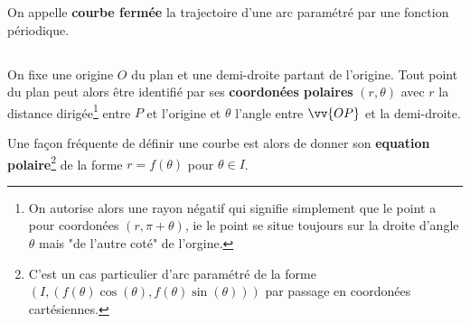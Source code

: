 On appelle \textbf{courbe fermée} la trajectoire d'une arc paramétré par une fonction périodique.

\subsection*{}
On fixe une origine \(O\) du plan et une demi-droite partant de l'origine.
Tout point du plan peut alors être identifié par ses \textbf{coordonées polaires} \((r, \theta)\) avec \(r\) la distance dirigée\footnote[3]{ On autorise alors une rayon négatif qui signifie simplement que le point a pour coordonées \((r, \pi + \theta)\), ie le point se situe toujours sur la droite d'angle \(\theta\) mais "de l'autre coté" de l'orgine.} entre \(P\) et l'origine et \(\theta\) l'angle entre \(\vv{OP}\) et la demi-droite.\<

Une façon fréquente de définir une courbe est alors de donner son \textbf{equation polaire}\footnote[4]{C'est un cas particulier d'arc paramétré de la forme \((I, (f(\theta)\cos(\theta), f(\theta)\sin(\theta)))\) par passage en coordonées cartésiennes.} de la forme \(r = f(\theta)\) pour \(\theta \in I\). 
\pagebreak

